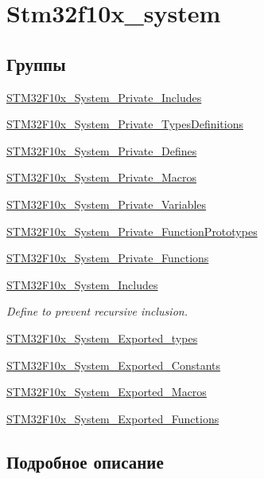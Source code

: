 \hypertarget{group__stm32f10x__system}{}\section{Stm32f10x\+\_\+system}
\label{group__stm32f10x__system}
\subsection*{Группы}
\begin{DoxyCompactItemize}
\item 
\mbox{\hyperlink{group___s_t_m32_f10x___system___private___includes}{S\+T\+M32\+F10x\+\_\+\+System\+\_\+\+Private\+\_\+\+Includes}}
\item 
\mbox{\hyperlink{group___s_t_m32_f10x___system___private___types_definitions}{S\+T\+M32\+F10x\+\_\+\+System\+\_\+\+Private\+\_\+\+Types\+Definitions}}
\item 
\mbox{\hyperlink{group___s_t_m32_f10x___system___private___defines}{S\+T\+M32\+F10x\+\_\+\+System\+\_\+\+Private\+\_\+\+Defines}}
\item 
\mbox{\hyperlink{group___s_t_m32_f10x___system___private___macros}{S\+T\+M32\+F10x\+\_\+\+System\+\_\+\+Private\+\_\+\+Macros}}
\item 
\mbox{\hyperlink{group___s_t_m32_f10x___system___private___variables}{S\+T\+M32\+F10x\+\_\+\+System\+\_\+\+Private\+\_\+\+Variables}}
\item 
\mbox{\hyperlink{group___s_t_m32_f10x___system___private___function_prototypes}{S\+T\+M32\+F10x\+\_\+\+System\+\_\+\+Private\+\_\+\+Function\+Prototypes}}
\item 
\mbox{\hyperlink{group___s_t_m32_f10x___system___private___functions}{S\+T\+M32\+F10x\+\_\+\+System\+\_\+\+Private\+\_\+\+Functions}}
\item 
\mbox{\hyperlink{group___s_t_m32_f10x___system___includes}{S\+T\+M32\+F10x\+\_\+\+System\+\_\+\+Includes}}
\begin{DoxyCompactList}\small\item\em Define to prevent recursive inclusion. \end{DoxyCompactList}\item 
\mbox{\hyperlink{group___s_t_m32_f10x___system___exported__types}{S\+T\+M32\+F10x\+\_\+\+System\+\_\+\+Exported\+\_\+types}}
\item 
\mbox{\hyperlink{group___s_t_m32_f10x___system___exported___constants}{S\+T\+M32\+F10x\+\_\+\+System\+\_\+\+Exported\+\_\+\+Constants}}
\item 
\mbox{\hyperlink{group___s_t_m32_f10x___system___exported___macros}{S\+T\+M32\+F10x\+\_\+\+System\+\_\+\+Exported\+\_\+\+Macros}}
\item 
\mbox{\hyperlink{group___s_t_m32_f10x___system___exported___functions}{S\+T\+M32\+F10x\+\_\+\+System\+\_\+\+Exported\+\_\+\+Functions}}
\end{DoxyCompactItemize}


\subsection{Подробное описание}
